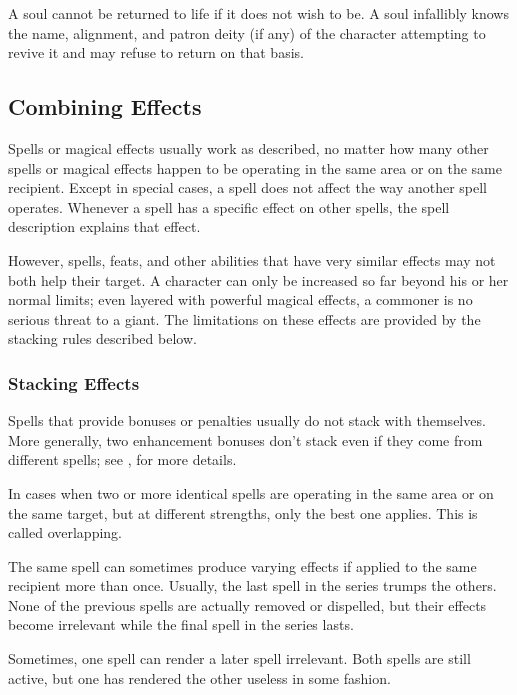              A soul cannot be returned to life if it does not wish to be.
            A soul infallibly knows the name, alignment, and patron deity (if any) of the character attempting to revive it and may refuse to return on that basis.

    \subsection{Combining Effects}
        Spells or magical effects usually work as described, no matter how many other spells or magical effects happen to be operating in the same area or on the same recipient.
        Except in special cases, a spell does not affect the way another spell operates.
        Whenever a spell has a specific effect on other spells, the spell description explains that effect.

        However, spells, feats, and other abilities that have very similar effects may not both help their target.
        A character can only be increased so far beyond his or her normal limits; even layered with powerful magical effects, a commoner is no serious threat to a giant.
        The limitations on these effects are provided by the stacking rules described below.

        \subsubsection{Stacking Effects}
            Spells that provide bonuses or penalties usually do not stack with themselves.
            More generally, two enhancement bonuses don't stack even if they come from different spells; see , for more details.

             In cases when two or more identical spells are operating in the same area or on the same target, but at different strengths, only the best one applies.
            This is called overlapping.

             The same spell can sometimes produce varying effects if applied to the same recipient more than once.
            Usually, the last spell in the series trumps the others.
            None of the previous spells are actually removed or dispelled, but their effects become irrelevant while the final spell in the series lasts.

             Sometimes, one spell can render a later spell irrelevant.
            Both spells are still active, but one has rendered the other useless in some fashion.

